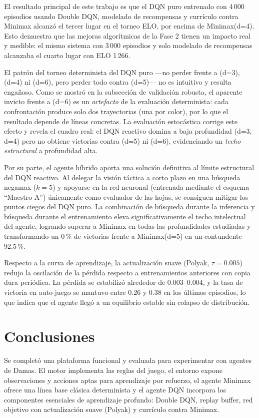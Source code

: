 \documentclass[11pt,a4paper]{article}
\begin{document}
El resultado principal de este trabajo es que el DQN puro entrenado con 4\,000 episodios usando Double DQN, modelado de recompensas y currículo contra Minimax alcanzó el tercer lugar en el torneo ELO, por encima de Minimax(d=4). Esto demuestra que las mejoras algorítmicas de la Fase 2 tienen un impacto real y medible: el mismo sistema con 3\,000 episodios y solo modelado de recompensas alcanzaba el cuarto lugar con ELO 1\,266.

El patrón del torneo determinista del DQN puro —no perder frente a (d=3), (d=4) ni (d=6), pero perder todo contra (d=5)— no es intuitivo y resulta engañoso. Como se mostró en la subsección de validación robusta, el aparente invicto frente a (d=6) es un \emph{artefacto} de la evaluación determinista: cada confrontación produce solo dos trayectorias (una por color), por lo que el resultado depende de líneas concretas. La evaluación estocástica corrige este efecto y revela el cuadro real: el DQN reactivo domina a baja profundidad (d=3, d=4) pero no obtiene victorias contra (d=5) ni (d=6), evidenciando un \emph{techo estructural} a profundidad alta.

Por su parte, el agente híbrido aporta una solución definitiva al límite estructural del DQN reactivo. Al delegar la visión táctica a corto plazo en una búsqueda negamax ($k=5$) y apoyarse en la red neuronal (entrenada mediante el esquema ``Maestro A'') únicamente como evaluador de las hojas, se consiguen mitigar los puntos ciegos del DQN puro. La combinación de búsqueda durante la inferencia y búsqueda durante el entrenamiento eleva significativamente el techo intelectual del agente, logrando superar a Minimax en todas las profundidades estudiadas y transformando un 0\,\% de victorias frente a Minimax(d=5) en un contundente 92.5\,\%.

Respecto a la curva de aprendizaje, la actualización suave (Polyak, $\tau=0.005$) redujo la oscilación de la pérdida respecto a entrenamientos anteriores con copia dura periódica. La pérdida se estabilizó alrededor de 0.003--0.004, y la tasa de victoria en auto-juego se mantuvo entre 0.26 y 0.38 en los últimos episodios, lo que indica que el agente llegó a un equilibrio estable sin colapso de distribución.

\section{Conclusiones}

Se completó una plataforma funcional y evaluada para experimentar con agentes de Damas. El motor implementa las reglas del juego, el entorno expone observaciones y acciones aptas para aprendizaje por refuerzo, el agente Minimax ofrece una línea base clásica determinista y el agente DQN incorpora los componentes esenciales de aprendizaje profundo: Double DQN, replay buffer, red objetivo con actualización suave (Polyak) y currículo contra Minimax.
\end{document}
